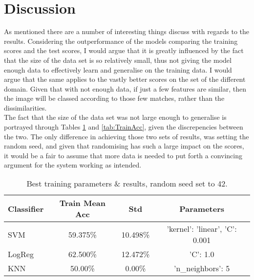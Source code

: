 \documentclass[11pt, a4paper]{article}
\begin{document}
\section{Discussion}
As mentioned there are a number of interesting things discuss with regards to the results. Considering the outperformance of the models comparing the training scores and the test scores, I would argue that it is greatly influenced by the fact that the size of the data set is so relatively small, thus not giving the model enough data to effectively learn and generalise on the training data. I would argue that the same applies to the vastly better scores on the set of the different domain. Given that with not enough data, if just a few features are similar, then the image will be classed according to those few matches, rather than the dissimilarities.\\
The fact that the size of the data set was not large enough to generalise is portrayed through Tables \ref{tab:randomSeed} and \ref{tab:TrainAcc}, given the discrepencies between the two. The only difference in achieving those two sets of results, was setting the random seed, and given that randomising has such a large impact on the scores, it would be a fair to assume that more data is needed to put forth a convincing argument for the system working as intended.\\

\begin{table}[h]
  \centering
  \tiny
  \setlength\tabcolsep{2pt}
    \begin{tabular}{l|ccc}
    Classifier & Train Mean Acc & Std      & Parameters                     \\\hline
    SVM        & 59.375\%       & 10.498\% & 'kernel': 'linear', 'C': 0.001 \\
    LogReg     & 62.500\%       & 12.472\% & 'C': 1.0                       \\
    KNN        & 50.00\%        & 0.00\%   & 'n\_neighbors': 5
    \end{tabular}
    \caption{Best training parameters \& results, random seed set to 42.}
  \label{tab:randomSeed}
\end{table}
\end{document}
